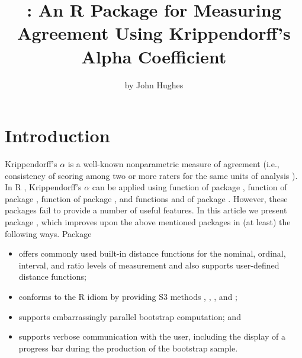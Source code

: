 \title{: An R Package for Measuring Agreement Using Krippendorff's Alpha Coefficient}
\author{by John Hughes}

\maketitle


\section{Introduction}
\label{intro}

Krippendorff's $\alpha$ \citep{hayes2007answering} is a well-known nonparametric measure of agreement (i.e., consistency of scoring among two or more raters for the same units of analysis \citep{gwet}). In R \citep{Ihak:Gent:r::1996}, Krippendorff's $\alpha$ can be applied using function  of package  \citep{irr}, function  of package  \citep{kripp.boot}, function  of package  \citep{icr}, and functions  and  of package  \citep{irrcac}. However, these packages fail to provide a number of useful features. In this article we present package , which improves upon the above mentioned packages in (at least) the following ways. Package 
\begin{itemize}
\item offers commonly used built-in distance functions for the nominal, ordinal, interval, and ratio levels of measurement and also supports user-defined distance functions;
\item conforms to the R idiom by providing S3 methods , , , and ;
\item supports embarrassingly parallel bootstrap computation; and
\item supports verbose communication with the user, including the display of a progress bar during the production of the bootstrap sample.
\end{itemize}

